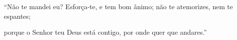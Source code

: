 ``Não te mandei eu? Esforça-te, e tem bom ânimo; não te atemorizes, nem te espantes; 

porque o Senhor teu Deus está contigo, por onde quer que andares.''
